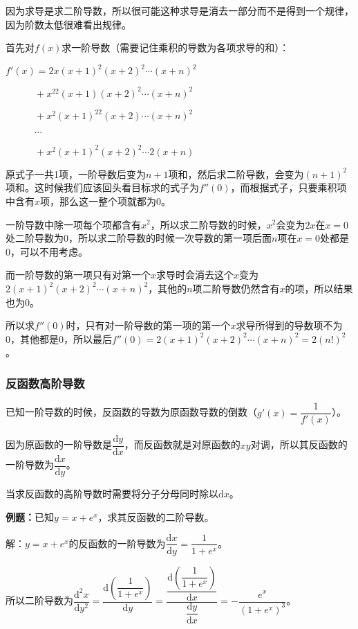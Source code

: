 因为求导是求二阶导数，所以很可能这种求导是消去一部分而不是得到一个规律，因为阶数太低很难看出规律。

首先对$f(x)$求一阶导数（需要记住乘积的导数为各项求导的和）：

$f'(x)=2x(x+1)^2(x+2)^2\cdots(x+n)^2$

$\quad\quad\quad+x^22(x+1)(x+2)^2\cdots(x+n)^2$

$\quad\quad\quad+x^2(x+1)^22(x+2)\cdots(x+n)^2$

$\quad\quad\quad\cdots$

$\quad\quad\quad+x^2(x+1)^2(x+2)^2\cdots 2(x+n)$

原式子一共1项，一阶导数后变为$n+1$项和，然后求二阶导数，会变为$(n+1)^2$项和。这时候我们应该回头看目标求的式子为$f''(0)$，而根据式子，只要乘积项中含有$x$项，那么这一整个项就都为0。

一阶导数中除一项每个项都含有$x^2$，所以求二阶导数的时候，$x^2$会变为$2x$在$x=0$处二阶导数为0，所以求二阶导数的时候一次导数的第一项后面$n$项在$x=0$处都是0，可以不用考虑。

而一阶导数的第一项只有对第一个$x$求导时会消去这个$x$变为$2(x+1)^2(x+2)^2\cdots(x+n)^2$，其他的$n$项二阶导数仍然含有$x$的项，所以结果也为0。

所以求$f''(0)$时，只有对一阶导数的第一项的第一个$x$求导所得到的导数项不为0，其他都是0，所以最后$f''(0)=2(x+1)^2(x+2)^2\cdots(x+n)^2=2(n!)^2$。

\subsubsection{反函数高阶导数}

已知一阶导数的时候，反函数的导数为原函数导数的倒数（$g'(x)=\dfrac{1}{f'(x)}$）。

因为原函数的一阶导数是$\dfrac{\textrm{d}y}{\textrm{d}x}$，而反函数就是对原函数的$xy$对调，所以其反函数的一阶导数为$\dfrac{\textrm{d}x}{\textrm{d}y}$。

当求反函数的高阶导数时需要将分子分母同时除以$\textrm{d}x$。

\textbf{例题：}已知$y=x+e^x$，求其反函数的二阶导数。

解：$y=x+e^x$的反函数的一阶导数为$\dfrac{\textrm{d}x}{\textrm{d}y}=\dfrac{1}{1+e^x}$。\medskip

所以二阶导数为$\dfrac{\textrm{d}^2x}{\textrm{d}y^2}=\dfrac{\textrm{d}\left(\dfrac{1}{1+e^{x}}\right)}{\textrm{d}y}=\dfrac{\dfrac{\textrm{d}\left(\dfrac{1}{1+e^{x}}\right)}{\textrm{d}x}}{\dfrac{\textrm{d}y}{\textrm{d}x}}=-\dfrac{e^x}{(1+e^x)^3}$。


